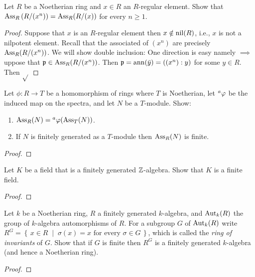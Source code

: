 \newpage
\begin{problem}
Let $R$ be a Noetherian ring and $x\in R$ an $R$-regular
element. Show that $\Ass_R\left(R/(x^n)\right)=\Ass_R(R/(x))$ for
every $n\geq 1$.
\end{problem}
\begin{proof}
Suppose that $x$ is an $R$-regular element then $x\notin\nil(R)$,
i.e., $x$ is not a nilpotent element. Recall that the associated
of $(x^n)$ are precisely $\Ass_R(R/(x^n))$. We will show double
inclusion: One direction is easy namely $\implies$ uppose that
$\mathfrak{p}\in\Ass_R(R/(x^n))$. Then $\mathfrak{p}=\ann(\bar
y)=((x^n):y)$ for some $y\in R$. Then $\sqrt{}$
\end{proof}
\newpage
\begin{problem}
Let $\phi\colon R\to T$ be a homomorphism of rings where $T$ is
Noetherian, let $\prescript{a}{}\phi$ be the induced map on the spectra,
and let $N$ be a $T$-module. Show:
\begin{enumerate}[label=(\alph*)]
\item $\Ass_R(N)=\prescript{a}{}\phi(\Ass_T(N))$.
\item If $N$ is finitely generated as a $T$-module then
  $\Ass_R(N)$ is finite.
\end{enumerate}
\end{problem}
\begin{proof}
\end{proof}
\newpage
\begin{problem}
Let $K$ be a field that is a finitely generated
$\ZZ$-algebra. Show that $K$ is a finite field.
\end{problem}
\begin{proof}
\end{proof}
\newpage
\begin{problem}
Let $k$ be a Noetherian ring, $R$ a finitely generated
$k$-algebra, and $\Aut_k(R)$ the group of $k$-algebra
automorphisms of $R$. For a subgroup $G$ of $\Aut_k(R)$ write
$R^G=\left\{\,x\in R\;\middle|\;\text{$\sigma(x)=x$ for every
    $\sigma\in G$}\,\right\}$, which is called the \emph{ring of
  invariants} of $G$. Show that if $G$ is finite then $R^G$ is a
finitely generated $k$-algebra (and hence a Noetherian ring).
\end{problem}
\begin{proof}
\end{proof}

